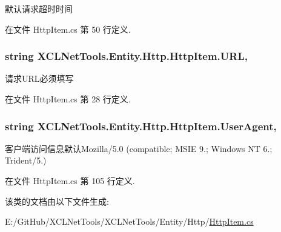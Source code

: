 默认请求超时时间 



在文件 Http\+Item.\+cs 第 50 行定义.

\subsubsection[{\texorpdfstring{U\+RL}{URL}}]{\setlength{\rightskip}{0pt plus 5cm}string X\+C\+L\+Net\+Tools.\+Entity.\+Http.\+Http\+Item.\+U\+RL\hspace{0.3cm}{\ttfamily [get]}, {\ttfamily [set]}}\hypertarget{class_x_c_l_net_tools_1_1_entity_1_1_http_1_1_http_item_aaaa3a229c51a9c1dab14f61c0104b380}{}\label{class_x_c_l_net_tools_1_1_entity_1_1_http_1_1_http_item_aaaa3a229c51a9c1dab14f61c0104b380}


请求\+U\+R\+L必须填写 



在文件 Http\+Item.\+cs 第 28 行定义.

\subsubsection[{\texorpdfstring{User\+Agent}{UserAgent}}]{\setlength{\rightskip}{0pt plus 5cm}string X\+C\+L\+Net\+Tools.\+Entity.\+Http.\+Http\+Item.\+User\+Agent\hspace{0.3cm}{\ttfamily [get]}, {\ttfamily [set]}}\hypertarget{class_x_c_l_net_tools_1_1_entity_1_1_http_1_1_http_item_af781edd22001f482ae8090b6cbee1cdb}{}\label{class_x_c_l_net_tools_1_1_entity_1_1_http_1_1_http_item_af781edd22001f482ae8090b6cbee1cdb}


客户端访问信息默认\+Mozilla/5.0 (compatible; M\+S\+IE 9.; Windows NT 6.; Trident/5.) 



在文件 Http\+Item.\+cs 第 105 行定义.



该类的文档由以下文件生成\+:\begin{DoxyCompactItemize}
\item 
E\+:/\+Git\+Hub/\+X\+C\+L\+Net\+Tools/\+X\+C\+L\+Net\+Tools/\+Entity/\+Http/\hyperlink{_http_item_8cs}{Http\+Item.\+cs}\end{DoxyCompactItemize}
